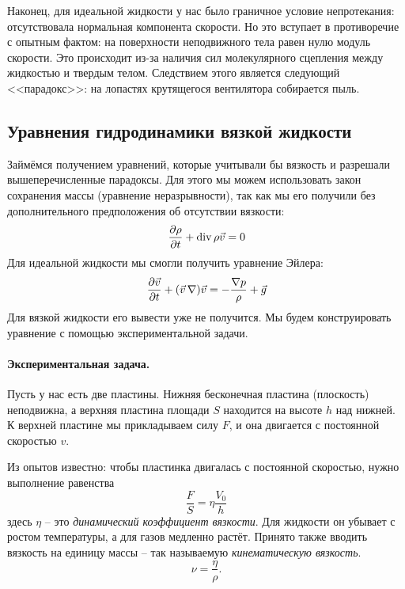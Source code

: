 Наконец, для идеальной жидкости у нас было граничное условие непротекания: отсутствовала нормальная компонента скорости. Но это вступает в противоречие с опытным фактом: на поверхности неподвижного тела равен нулю модуль скорости. Это происходит из-за наличия сил молекулярного сцепления между жидкостью и твердым телом. Следствием этого является следующий <<парадокс>>: на лопастях крутящегося вентилятора собирается пыль. 

\subsection{Уравнения гидродинамики вязкой жидкости}

Займёмся получением уравнений, которые учитывали бы вязкость и разрешали вышеперечисленные парадоксы. Для этого мы можем использовать закон сохранения массы (уравнение неразрывности), так как мы его получили без дополнительного предположения об отсутствии вязкости:
\begin{equation}
    \pdv{\rho}{t}+\operatorname{div} \rho \vec{v} = 0
\end{equation}
Для идеальной жидкости мы смогли получить уравнение Эйлера:
\begin{equation}
    \pdv{\vec{v}}{t}+(\vec{v}\,\nabla)\vec{v} = -\frac{\nabla p}{\rho}+\vec{g}
\end{equation}
Для вязкой жидкости его вывести уже не получится. Мы будем конструировать уравнение с помощью экспериментальной задачи.

\paragraph{Экспериментальная задача.} Пусть у нас есть две пластины. Нижняя бесконечная пластина (плоскость) неподвижна, а верхняя пластина площади $S$ находится на высоте $h$ над нижней. К верхней пластине мы прикладываем силу $F$, и она двигается с постоянной скоростью $v$.

Из опытов известно: чтобы пластинка двигалась с постоянной скоростью, нужно выполнение равенства
\begin{equation}
    \frac{F}{S} = \eta \frac{V_0}{h}
\end{equation}
здесь $\eta$ -- это \textit{динамический коэффициент вязкости}. Для жидкости он убывает с ростом температуры, а для газов медленно растёт.
Принято также вводить вязкость на единицу массы -- так называемую \textit{кинематическую вязкость}.
\begin{equation}
    \nu = \frac{\eta}{\rho}.
\end{equation}


